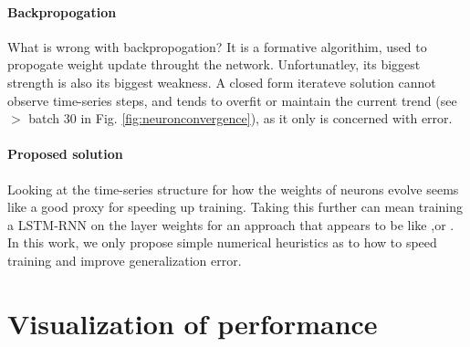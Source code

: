 \documentclass[a1,landscape]{a0poster}
\begin{document}
\begin{multicols}{4}
	      \paragraph{Backpropogation}
	      What is wrong with backpropogation? It is a formative algorithim, used to propogate weight update throught the network. Unfortunatley, its biggest strength is also its biggest weakness.
	      A closed form iterateve solution cannot observe time-series steps, and tends to overfit or maintain the current trend (see $>$ batch 30 in Fig. \ref{fig:neuronconvergence}), as it only is concerned with error. 
	      \paragraph{Proposed solution}
	      Looking at the time-series structure for how the weights of neurons evolve seems like a good proxy for speeding up training. Taking this further can mean training a LSTM-RNN on the layer weights for an approach that appears to be like \cite{zoph2016neural},or \cite{tang2016recurrent}.
	      In this work, we only propose simple numerical heuristics as to how to speed training and improve generalization error.
	      
	  \section*{Visualization of performance}

\end{multicols}
\end{document}
